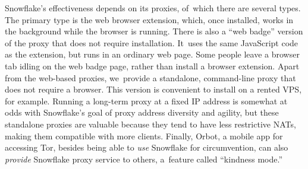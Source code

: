 \documentclass[letterpaper,twocolumn]{article}
\begin{document}
Snowflake's effectiveness depends on its proxies,
of~which there are several types.
The primary type is the web browser extension,
which, once installed, works in the background
while the browser is running.
There is also a ``web badge'' version of the proxy that does not require installation.
It~uses the same JavaScript code as the extension, but runs in an ordinary web page.
Some people leave a browser tab idling on the web badge page,
rather than install a browser extension.
Apart from the web-based proxies,
we~provide a standalone, command-line proxy
that does not require a browser.
This version is convenient to install on a rented VPS, for example.
Running a long-term proxy at a fixed IP address
is somewhat at odds with Snowflake's goal of proxy address diversity and agility,
but these standalone proxies are valuable because
they tend to have less restrictive NATs,
making them compatible with more clients.
Finally, Orbot, a mobile app for accessing Tor,
besides being able to \emph{use} Snowflake for circumvention,
can also \emph{provide} Snowflake proxy service to others,
a~feature called ``kindness mode.''
\end{document}
